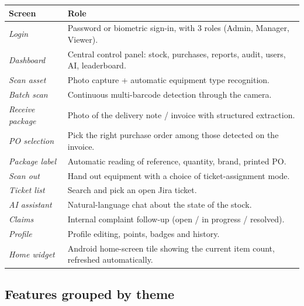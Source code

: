 \documentclass[11pt,a4paper]{article}
\begin{document}
\begin{tabularx}{\linewidth}{@{}lX@{}}
\toprule
\textbf{Screen} & \textbf{Role}\\
\midrule
\textit{Login}                & Password or biometric sign-in, with 3 roles (Admin, Manager, Viewer). \\
\textit{Dashboard}            & Central control panel: stock, purchases, reports, audit, users, AI, leaderboard. \\
\textit{Scan asset}           & Photo capture + automatic equipment type recognition. \\
\textit{Batch scan}           & Continuous multi-barcode detection through the camera. \\
\textit{Receive package}      & Photo of the delivery note / invoice with structured extraction. \\
\textit{PO selection}         & Pick the right purchase order among those detected on the invoice. \\
\textit{Package label}        & Automatic reading of reference, quantity, brand, printed PO. \\
\textit{Scan out}             & Hand out equipment with a choice of ticket-assignment mode. \\
\textit{Ticket list}          & Search and pick an open Jira ticket. \\
\textit{AI assistant}         & Natural-language chat about the state of the stock. \\
\textit{Claims}               & Internal complaint follow-up (open / in progress / resolved). \\
\textit{Profile}              & Profile editing, points, badges and history. \\
\textit{Home widget}          & Android home-screen tile showing the current item count, refreshed automatically. \\
\bottomrule
\end{tabularx}

\subsection{Features grouped by theme}
\end{document}
